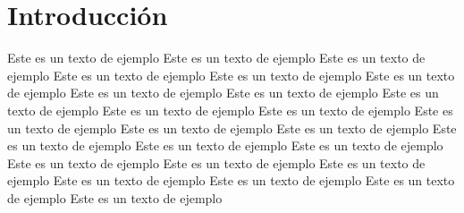 \documentclass[a4paper, 12pt]{article}
\newcommand{\logoPortada}{imagen/logo-inacap.png}
\newcommand{\startDate}{09 de Noviembre del 2021}
\begin{document}
    \rfoot[]{\thepage} %
    
    \clearpage 

     \tableofcontents
     \clearpage

    \section{\textcolor{rojoPortada}{Introducción}}
    Este es un texto de ejemplo Este es un texto de ejemplo Este es un texto de ejemplo Este es un texto de ejemplo Este es un texto de ejemplo Este es un texto de ejemplo Este es un texto de ejemplo Este es un texto de ejemplo Este es un texto de ejemplo Este es un texto de ejemplo Este es un texto de ejemplo Este es un texto de ejemplo Este es un texto de ejemplo Este es un texto de ejemplo Este es un texto de ejemplo Este es un texto de ejemplo Este es un texto de ejemplo Este es un texto de ejemplo Este es un texto de ejemplo Este es un texto de ejemplo Este es un texto de ejemplo Este es un texto de ejemplo Este es un texto de ejemplo Este es un texto de ejemplo 
    \clearpage
\end{document}
